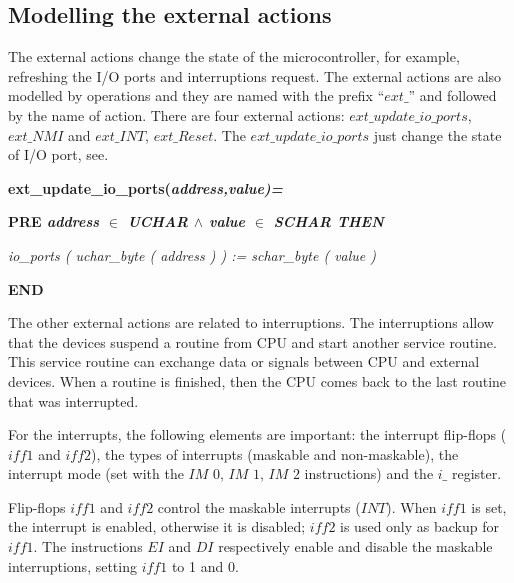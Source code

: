 \documentclass[a4paper]{llncs}
\begin{document}
\subsection{Modelling the external actions}
\label{sec:externalactions}

The external actions change the state of the microcontroller, for example, refreshing the I/O ports
and interruptions request. The external actions are also modelled by operations and they are named with the
prefix ``$ext\_$'' and followed by the name of action. There are four external
actions: $ext\_update\_io\_ports$, $ext\_NMI$ and $ext\_INT$, $ext\_Reset$. The
$ext\_update\_io\_ports$ just change the state of I/O port, see.

\hspace*{0.20in}\bf ext\_update\_io\_ports\rm (\it address\rm ,\it value\rm )\rm =

\hspace*{0.20in}\bf PRE \it address  $\in$  \it UCHAR  $\land$ \hspace*{0.10in}\it value  $\in$  \it SCHAR \bf THEN

\hspace*{0.40in}\it io\_ports \rm ( \it uchar\_byte \rm ( \it address \rm ) \rm ) \rm := \it schar\_byte \rm ( \it
value \rm )

\hspace*{0.20in}\bf END\rm 

The other external actions are related to interruptions. The interruptions allow
that the devices suspend a routine from CPU and start another service routine.
This service routine can exchange data or signals between CPU and external
devices. When a routine is finished, then the CPU comes back to the last routine
that was interrupted.

For the interrupts, the following elements are important:  the interrupt flip-flops
($\textit{iff1}$ and $\textit{iff2}$), the types of interrupts (maskable and
non-maskable), the interrupt mode (set with the $\textit{IM 0}$, $\textit{IM 1}$,
$\textit{IM 2}$ instructions) and the $\textit{i\_}$ register.

Flip-flops $\textit{iff1}$ and $\textit{iff2}$ control the maskable interrupts
($\textit{INT}$). When $\textit{iff1}$ is set, the interrupt is enabled,
otherwise it is disabled; $\textit{iff2}$ is used only as backup for $\textit{iff1}$. The
instructions $\textit{EI}$ and $\textit{DI}$ respectively enable and disable the
maskable interruptions, setting  $\textit{iff1}$ to 1 and 0.
\end{document}
